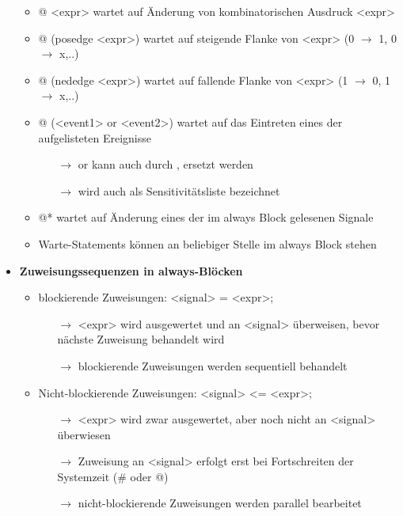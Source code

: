 \begin{itemize}
\begin{itemize}
	\item @ <expr> wartet auf Änderung von kombinatorischen Ausdruck <expr>
	\item @ (posedge <expr>) wartet auf steigende Flanke von <expr> (0 $\rightarrow$ 1, 0 $\rightarrow$ x,..)
	\item @ (nededge <expr>) wartet auf fallende Flanke von <expr> (1 $\rightarrow$ 0, 1 $\rightarrow$ x,..)
	\item @ (<event1> or <event2>) wartet auf das Eintreten eines der aufgelisteten Ereignisse
		\begin{itemize}
		\item[$\rightarrow$] or kann auch durch , ersetzt werden
		\item[$\rightarrow$] wird auch als Sensitivitätsliste bezeichnet
		\end{itemize}
	\item @* wartet auf Änderung eines der im always Block gelesenen Signale
	\item Warte-Statements können an beliebiger Stelle im always Block stehen
	
	\end{itemize}
	
\item \textbf{Zuweisungssequenzen in always-Blöcken}
	\begin{itemize}
	\item blockierende Zuweisungen: <signal> = <expr>;
		\begin{itemize}
		\item[$\rightarrow$] <expr> wird ausgewertet und an <signal> überweisen, bevor nächste Zuweisung behandelt wird
		\item[$\rightarrow$] blockierende Zuweisungen werden sequentiell behandelt
		\end{itemize}
	\item Nicht-blockierende Zuweisungen: <signal> <= <expr>;
		\begin{itemize}
		\item[$\rightarrow$] <expr> wird zwar ausgewertet, aber noch nicht an <signal> überwiesen
		\item[$\rightarrow$] Zuweisung an <signal> erfolgt erst bei Fortschreiten der Systemzeit (\# oder @)
		\item[$\rightarrow$] nicht-blockierende Zuweisungen werden parallel bearbeitet
		\end{itemize}
	\end{itemize}


\end{itemize}
